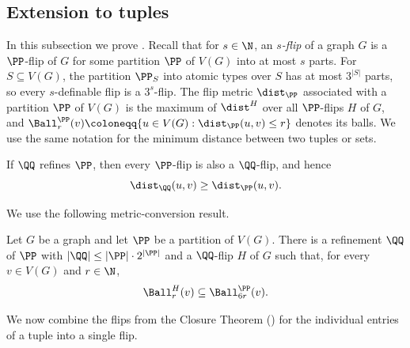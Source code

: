 \subsection{Extension to tuples}\label{sec:closures-tuples}
In this subsection we prove .
Recall that for $s\in\N$, an \emph{$s$-flip} of a graph $G$ is a $\PP$-flip of $G$ for some partition $\PP$ of $V(G)$ into at most $s$ parts.
For $S\subseteq V(G)$, the partition $\PP_S$ into atomic types over $S$ has at most $3^{|S|}$ parts, so every $s$-definable flip is a $3^s$-flip.
The flip metric $\dist_\PP$ associated with a partition $\PP$ of $V(G)$ is the maximum of $\dist^H$ over all $\PP$-flips $H$ of $G$, and $\Ball^\PP_r(v)\coloneqq\{u\in V(G):\dist_\PP(u,v)\leq r\}$ denotes its balls.
We use the same notation for the minimum distance between two tuples or sets.

\begin{observation}\label{obs:partition-distance-monotone}
If $\QQ$ refines $\PP$, then every $\PP$-flip is also a $\QQ$-flip, and hence
\[
    \dist_\QQ(u,v)\geq \dist_\PP(u,v).
\]
\end{observation}

We use the following metric-conversion result.

\begin{lemma}\label{lem:partition-metric-conversion}
    Let $G$ be a graph and let $\PP$ be a partition of $V(G)$. There is a refinement $\QQ$ of $\PP$ with $|\QQ|\leq |\PP|\cdot 2^{|\PP|}$ and a $\QQ$-flip $H$ of $G$ such that, for every $v\in V(G)$ and $r\in\N$,
    \[
        \Ball^H_r(v)\subseteq\Ball^\PP_{6r}(v).
    \]
\end{lemma}

We now combine the flips from  the Closure Theorem () for the individual entries of a tuple into a single flip.

\thmClosuresTuples*

